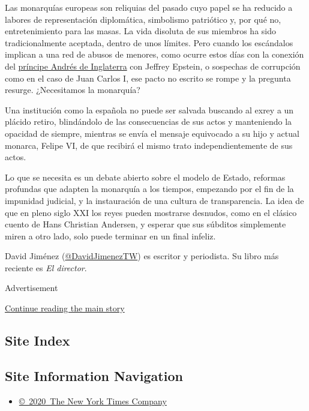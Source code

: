 Las monarquías europeas son reliquias del pasado cuyo papel se ha
reducido a labores de representación diplomática, simbolismo patriótico
y, por qué no, entretenimiento para las masas. La vida disoluta de sus
miembros ha sido tradicionalmente aceptada, dentro de unos límites. Pero
cuando los escándalos implican a una red de abusos de menores, como
ocurre estos días con la conexión del
\href{https://www.nytimes3xbfgragh.onion/2020/07/05/us/politics/prince-andrew-jeffrey-epstein.html}{príncipe
Andrés de Inglaterra} con Jeffrey Epstein, o sospechas de corrupción
como en el caso de Juan Carlos I, ese pacto no escrito se rompe y la
pregunta resurge. ¿Necesitamos la monarquía?

Una institución como la española no puede ser salvada buscando al exrey
a un plácido retiro, blindándolo de las consecuencias de sus actos y
manteniendo la opacidad de siempre, mientras se envía el mensaje
equivocado a su hijo y actual monarca, Felipe VI, de que recibirá el
mismo trato independientemente de sus actos.

Lo que se necesita es un debate abierto sobre el modelo de Estado,
reformas profundas que adapten la monarquía a los tiempos, empezando por
el fin de la impunidad judicial, y la instauración de una cultura de
transparencia. La idea de que en pleno siglo XXI los reyes pueden
mostrarse desnudos, como en el clásico cuento de Hans Christian
Andersen, y esperar que sus súbditos simplemente miren a otro lado, solo
puede terminar en un final infeliz.

David Jiménez
(\href{https://twitter.com/DavidJimenezTW}{@DavidJimenezTW}) es escritor
y periodista. Su libro más reciente es \emph{El director}.

Advertisement

\protect\hyperlink{after-bottom}{Continue reading the main story}

\hypertarget{site-index}{%
\subsection{Site Index}\label{site-index}}

\hypertarget{site-information-navigation}{%
\subsection{Site Information
Navigation}\label{site-information-navigation}}

\begin{itemize}
\tightlist
\item
  \href{https://help.nytimes3xbfgragh.onion/hc/en-us/articles/115014792127-Copyright-notice}{©~2020~The
  New York Times Company}
\end{itemize}

